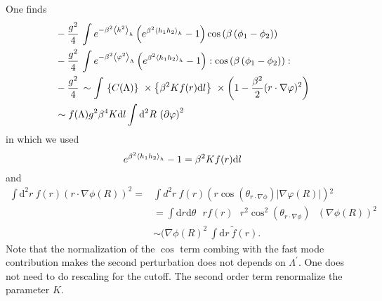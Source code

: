 \documentclass[submission, PhysLectNotes]{SciPost}
\begin{document}
One finds
\begin{equation}
	\begin{aligned}
		&- \frac{ g^2 }{4} \, \int e^{-\beta^2 \expval{h^2}_h} \left( e^{\beta ^2 \expval{h_1h_2}_h}-1\right) \cos \left( \beta  \left(\phi _1 - \phi _2\right) \right) \\
		&- \frac{ g^2 }{4} \, \int e^{-\beta^2 \expval{\varphi^2}_\Lambda} \left( e^{\beta ^2 \expval{h_1h_2}_h}-1\right) :\cos \left( \beta  \left(\phi _1 - \phi _2\right) \right):\\
		&- \frac{ g^2 }{4} \, \sim \int \, \left\{ C(\Lambda)\right\} \ \times \left\{\beta^2 K f(r) \mathrm{d}l\right\} \ \times \left(1 - \frac{\beta ^2}{2} ( r\cdot \nabla \varphi)^2\right)\\
		&\sim f(\Lambda) g^2 \beta^4 K\mathrm{d}l \int \mathrm{d}^2R\,  \left(\partial \varphi\right)^2
	\end{aligned}
\end{equation}
in which we used
\begin{equation}
e^{\beta^2 \expval{h_1h_2}_h}-1 = \beta^2 K f(r) \text{d}l
\end{equation}
and
\begin{equation}
	\begin{aligned}
		\int \mathrm{d}^2r \ f(r) ( r\cdot \nabla \phi (R ) )^2 =&\int d^2r \ f(r) \left(r \cos \left(\theta _{r\cdot \nabla \phi }\right) |\nabla \varphi(R)| \right){}^2 \\ 
		&= \int \text{d}r \text{d$\theta $}\text{  }r f(r)\text{  }r^2 \cos ^2\left(\theta _{r\cdot \nabla \phi }\right)\text{  }(\nabla \phi(R) )^2\\
		&\sim (\nabla \phi(R)^2 \ \int \text{d}r \ \tilde{f}(r).		
	\end{aligned}
\end{equation}
Note that the normalization of the $\cos$ term combing with the fast mode contribution makes the second perturbation does not depends on $\Lambda^\prime$. One does not need to do rescaling for the cutoff. The second order term renormalize the parameter $K$.
\end{document}
